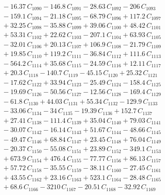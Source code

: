 \documentclass[a4paper,11pt]{article}
\begin{document}
\begin{align}
&\quad - 16.37\,C_{1090} - 146.8\,C_{1091} - 28.63\,C_{1092} - 206\,C_{1093} \nonumber\\
&\quad - 159.1\,C_{1094} - 21.18\,C_{1095} - 68.79\,C_{1096} + 117.2\,C_{1097} \nonumber\\
&\quad + 32.25\,C_{1098} - 35.88\,C_{1099} + 39.06\,C_{1100} + 48.42\,C_{1101} \nonumber\\
&\quad + 53.31\,C_{1102} + 22.62\,C_{1103} - 207.1\,C_{1104} + 63.93\,C_{1105} \nonumber\\
&\quad - 32.01\,C_{1106} + 20.13\,C_{1107} + 106.9\,C_{1108} - 21.79\,C_{1109} \nonumber\\
&\quad + 19.85\,C_{1110} + 119.2\,C_{1111} - 36.84\,C_{1112} + 111.6\,C_{1113} \nonumber\\
&\quad - 564.2\,C_{1114} + 35.68\,C_{1115} - 24.59\,C_{1116} + 12.11\,C_{1117} \nonumber\\
&\quad + 20.3\,C_{1118} - 140.7\,C_{1119} - 45.15\,C_{1120} + 25.32\,C_{1121} \nonumber\\
&\quad - 17.62\,C_{1122} + 33.94\,C_{1123} - 25.49\,C_{1124} - 158.4\,C_{1125} \nonumber\\
&\quad - 19.69\,C_{1126} - 50.56\,C_{1127} - 12.56\,C_{1128} - 169.4\,C_{1129} \nonumber\\
&\quad - 61.8\,C_{1130} + 44.03\,C_{1131} + 55.34\,C_{1132} - 129.9\,C_{1133} \nonumber\\
&\quad - 33.06\,C_{1134} - 34\,C_{1135} - 19.39\,C_{1136} + 152.7\,C_{1137} \nonumber\\
&\quad + 27.41\,C_{1138} - 111.4\,C_{1139} + 35.04\,C_{1140} + 79.03\,C_{1141} \nonumber\\
&\quad - 30.07\,C_{1142} - 16.14\,C_{1143} + 51.67\,C_{1144} - 48.66\,C_{1145} \nonumber\\
&\quad - 49.47\,C_{1146} + 68.84\,C_{1147} + 23.45\,C_{1148} + 76.04\,C_{1149} \nonumber\\
&\quad - 20.37\,C_{1150} - 55.08\,C_{1151} + 23.89\,C_{1152} - 349.1\,C_{1153} \nonumber\\
&\quad + 673.9\,C_{1154} + 476.4\,C_{1155} - 77.77\,C_{1156} + 86.13\,C_{1157} \nonumber\\
&\quad + 57.72\,C_{1158} - 35.55\,C_{1159} - 38.11\,C_{1160} - 27.45\,C_{1161} \nonumber\\
&\quad + 43.55\,C_{1162} + 23.16\,C_{1163} + 523.1\,C_{1164} - 28.48\,C_{1165} \nonumber\\
&\quad + 68.6\,C_{1166} - 3210\,C_{1167} - 20.51\,C_{1168} - 32.92\,C_{1169} \nonumber\\

\end{align}
\end{document}

